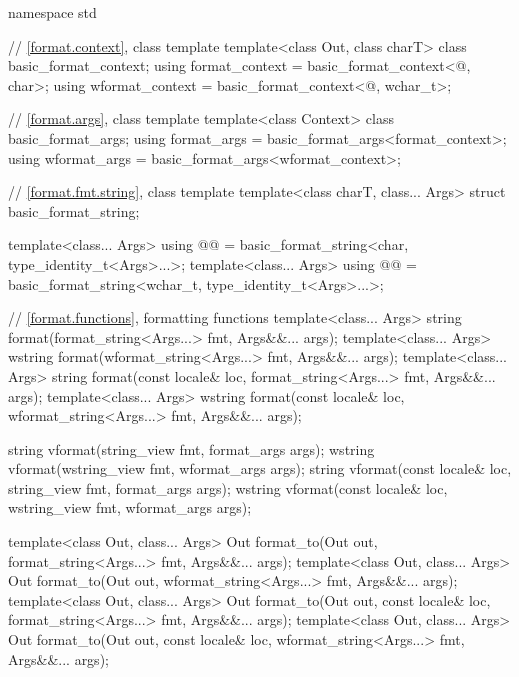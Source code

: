 %
%
%
%
%
%
%
%
%
%
%
\begin{codeblock}
namespace std {
  // \ref{format.context}, class template 
  template<class Out, class charT> class basic_format_context;
  using format_context = basic_format_context<@\unspec@, char>;
  using wformat_context = basic_format_context<@\unspec@, wchar_t>;

  // \ref{format.args}, class template 
  template<class Context> class basic_format_args;
  using format_args = basic_format_args<format_context>;
  using wformat_args = basic_format_args<wformat_context>;

  // \ref{format.fmt.string}, class template 
  template<class charT, class... Args>
    struct basic_format_string;

  template<class... Args>
    using @@ = basic_format_string<char, type_identity_t<Args>...>;
  template<class... Args>
    using @@ = basic_format_string<wchar_t, type_identity_t<Args>...>;

  // \ref{format.functions}, formatting functions
  template<class... Args>
    string format(format_string<Args...> fmt, Args&&... args);
  template<class... Args>
    wstring format(wformat_string<Args...> fmt, Args&&... args);
  template<class... Args>
    string format(const locale& loc, format_string<Args...> fmt, Args&&... args);
  template<class... Args>
    wstring format(const locale& loc, wformat_string<Args...> fmt, Args&&... args);

  string vformat(string_view fmt, format_args args);
  wstring vformat(wstring_view fmt, wformat_args args);
  string vformat(const locale& loc, string_view fmt, format_args args);
  wstring vformat(const locale& loc, wstring_view fmt, wformat_args args);

  template<class Out, class... Args>
    Out format_to(Out out, format_string<Args...> fmt, Args&&... args);
  template<class Out, class... Args>
    Out format_to(Out out, wformat_string<Args...> fmt, Args&&... args);
  template<class Out, class... Args>
    Out format_to(Out out, const locale& loc, format_string<Args...> fmt, Args&&... args);
  template<class Out, class... Args>
    Out format_to(Out out, const locale& loc, wformat_string<Args...> fmt, Args&&... args);

}
\end{codeblock}

